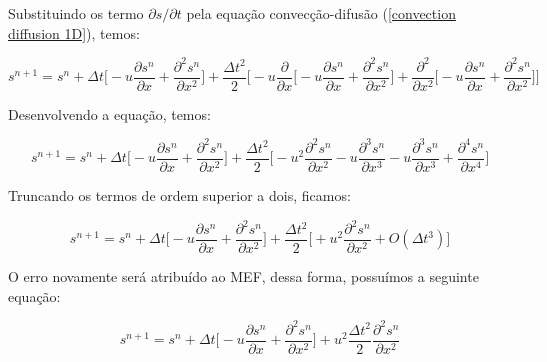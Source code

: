 Substituindo os termo $\partial s/ \partial t$ pela equação
convecção-difusão (\ref{convection diffusion 1D}), temos:

\begin{equation}
 s^{n+1} = s^{n} 
         + \Delta t 
         \bigg[
         - u \frac{\partial s^{n}}{\partial x}
         + \frac{\partial^2 s^{n}}{\partial x^2} 
         \bigg]
         + \frac{\Delta t^2}{2}
         \bigg[
         - u
         \frac{\partial }{\partial x}
         \bigg[
          - u \frac{\partial s^{n}}{\partial x}
          + \frac{\partial^2 s^{n}}{\partial x^2} 
         \bigg]
         + \frac{\partial^2 }{\partial x^2}
         \bigg[
          - u \frac{\partial s^{n}}{\partial x}
          + \frac{\partial^2 s^{n}}{\partial x^2} 
         \bigg]
         \bigg]
\end{equation}

\medskip
Desenvolvendo a equação, temos:

\begin{equation}
 s^{n+1} = s^{n} 
         + \Delta t 
         \bigg[
         - u \frac{\partial s^{n}}{\partial x}
         + \frac{\partial^2 s^{n}}{\partial x^2} 
         \bigg]
         + \frac{\Delta t^2}{2}
         \bigg[
         - u^2 \frac{\partial^2 s^{n}}{\partial x^2}
         - u \frac{\partial^3 s^{n}}{\partial x^3} 
         - u \frac{\partial^3 s^{n}}{\partial x^3}
         + \frac{\partial^4 s^{n}}{\partial x^4} 
         \bigg]
\end{equation}

\medskip
Truncando os termos de ordem superior a dois, ficamos:

\begin{equation}
 s^{n+1} = s^{n} 
         + \Delta t 
         \bigg[
         - u \frac{\partial s^{n}}{\partial x}
         + \frac{\partial^2 s^{n}}{\partial x^2} 
         \bigg]
         + \frac{\Delta t^2}{2}
         \bigg[
         + u^2 \frac{\partial^2 s^{n}}{\partial x^2}
         + O(\Delta t^3) 
         \bigg]
\end{equation}

\medskip
O erro novamente será atribuído ao MEF, dessa forma, possuímos
a seguinte equação:

\begin{equation}
 s^{n+1} = s^{n} 
         + \Delta t 
         \bigg[
         - u \frac{\partial s^{n}}{\partial x}
         + \frac{\partial^2 s^{n}}{\partial x^2} 
         \bigg]
         + u^2 
         \frac{\Delta t^2}{2}
         \frac{\partial^2 s^{n}}{\partial x^2}
\end{equation}

